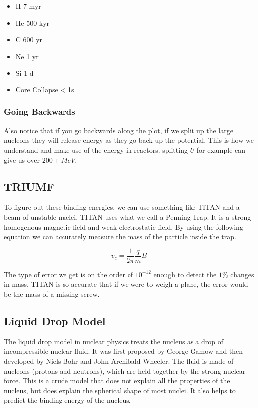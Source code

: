 \documentclass[english, 11pt]{article}
\begin{document}
\begin{itemize}
  \item H 7 myr \
  \item He 500 kyr \
  \item C 600 yr \
  \item Ne 1 yr \
  \item Si 1 d \
  \item Core Collapse < 1s
\end{itemize}

\subsubsection*{Going Backwards}

Also notice that if you go backwards along the plot, if we split up the large nucleons they will release energy as they go back up the potential. This is how we understand and make use of the energy in reactors. splitting $U$ for example can give us over $200+ MeV$.

\subsection{TRIUMF}

To figure out these binding energies, we can use something like TITAN and a beam of unstable nuclei. TITAN uses what we call a Penning Trap. It is a strong homogenous magnetic field and weak electrostatic field. By using the following equation we can accurately measure the mass of the particle inside the trap.

\[ v_c = \frac{1}{2\pi}\frac{q}{m}B\]

The type of error we get is on the order of $10^{-12}$ enough to detect the $1\%$ changes in mass. TITAN is so accurate that if we were to weigh a plane, the error would be the mass of a missing screw.

\subsection{Liquid Drop Model}

The liquid drop model in nuclear physics treats the nucleus as a drop of incompressible nuclear fluid. It was first proposed by George Gamow and then developed by Niels Bohr and John Archibald Wheeler. The fluid is made of nucleons (protons and neutrons), which are held together by the strong nuclear force. This is a crude model that does not explain all the properties of the nucleus, but does explain the spherical shape of most nuclei. It also helps to predict the binding energy of the nucleus.
\end{document}
